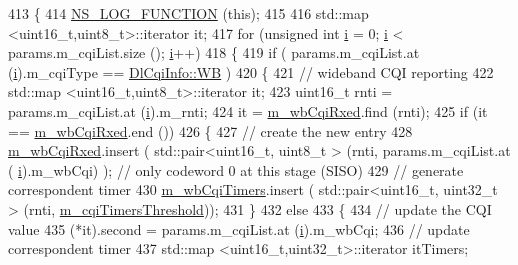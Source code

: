\begin{DoxyCode}
413 \{
414   \hyperlink{log-macros-disabled_8h_a90b90d5bad1f39cb1b64923ea94c0761}{NS\_LOG\_FUNCTION} (\textcolor{keyword}{this});
415 
416   std::map <uint16\_t,uint8\_t>::iterator it;
417   \textcolor{keywordflow}{for} (\textcolor{keywordtype}{unsigned} \textcolor{keywordtype}{int} \hyperlink{bernuolliDistribution_8m_a6f6ccfcf58b31cb6412107d9d5281426}{i} = 0; \hyperlink{bernuolliDistribution_8m_a6f6ccfcf58b31cb6412107d9d5281426}{i} < params.m\_cqiList.size (); \hyperlink{bernuolliDistribution_8m_a6f6ccfcf58b31cb6412107d9d5281426}{i}++)
418     \{
419       \textcolor{keywordflow}{if} ( params.m\_cqiList.at (\hyperlink{bernuolliDistribution_8m_a6f6ccfcf58b31cb6412107d9d5281426}{i}).m\_cqiType == \hyperlink{structns3_1_1DlCqiInfo_a58a9fff4b49e4a8df1fdea1005c4735caa1097f844b06ac6dbdbac42802ba2403}{DlCqiInfo::WB} )
420         \{
421           \textcolor{comment}{// wideband CQI reporting}
422           std::map <uint16\_t,uint8\_t>::iterator it;
423           uint16\_t rnti = params.m\_cqiList.at (\hyperlink{bernuolliDistribution_8m_a6f6ccfcf58b31cb6412107d9d5281426}{i}).m\_rnti;
424           it = \hyperlink{classns3_1_1MmWaveFlexTtiPfMacScheduler_a2b746dc09bafd9ebdc2912b26c74beb9}{m\_wbCqiRxed}.find (rnti);
425           \textcolor{keywordflow}{if} (it == \hyperlink{classns3_1_1MmWaveFlexTtiPfMacScheduler_a2b746dc09bafd9ebdc2912b26c74beb9}{m\_wbCqiRxed}.end ())
426             \{
427               \textcolor{comment}{// create the new entry}
428               \hyperlink{classns3_1_1MmWaveFlexTtiPfMacScheduler_a2b746dc09bafd9ebdc2912b26c74beb9}{m\_wbCqiRxed}.insert ( std::pair<uint16\_t, uint8\_t > (rnti, params.m\_cqiList.at (
      \hyperlink{bernuolliDistribution_8m_a6f6ccfcf58b31cb6412107d9d5281426}{i}).m\_wbCqi) ); \textcolor{comment}{// only codeword 0 at this stage (SISO)}
429               \textcolor{comment}{// generate correspondent timer}
430               \hyperlink{classns3_1_1MmWaveFlexTtiPfMacScheduler_a3a90d6728425934c4358680b51666147}{m\_wbCqiTimers}.insert ( std::pair<uint16\_t, uint32\_t > (rnti, 
      \hyperlink{classns3_1_1MmWaveFlexTtiPfMacScheduler_ad61563379565ec249cdf6b4092fef22e}{m\_cqiTimersThreshold}));
431             \}
432           \textcolor{keywordflow}{else}
433             \{
434               \textcolor{comment}{// update the CQI value}
435               (*it).second = params.m\_cqiList.at (\hyperlink{bernuolliDistribution_8m_a6f6ccfcf58b31cb6412107d9d5281426}{i}).m\_wbCqi;
436               \textcolor{comment}{// update correspondent timer}
437               std::map <uint16\_t,uint32\_t>::iterator itTimers;

\end{DoxyCode}
